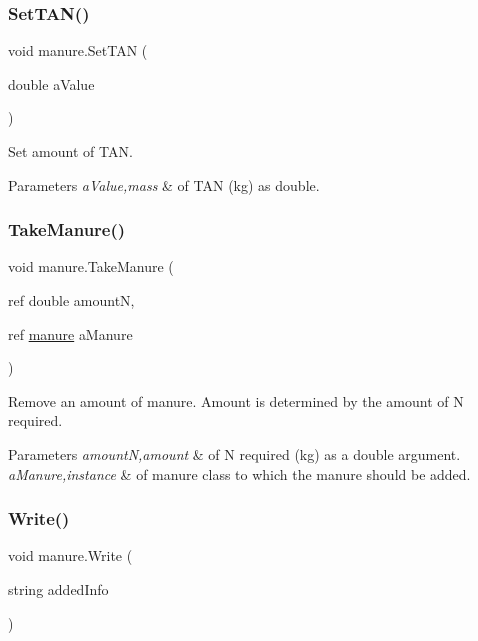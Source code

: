 \subsubsection{\texorpdfstring{SetTAN()}{SetTAN()}}
{\footnotesize\ttfamily void manure.\+Set\+T\+AN (\begin{DoxyParamCaption}\item[{double}]{a\+Value }\end{DoxyParamCaption})\hspace{0.3cm}{\ttfamily [inline]}}



Set amount of T\+AN. 


\begin{DoxyParams}{Parameters}
{\em a\+Value,mass} & of T\+AN (kg) as double. \\
\hline
\end{DoxyParams}
\mbox{\label{classmanure_a0343f18d1a91ea0e5ba040a3c8d98e15}} 
\subsubsection{\texorpdfstring{TakeManure()}{TakeManure()}}
{\footnotesize\ttfamily void manure.\+Take\+Manure (\begin{DoxyParamCaption}\item[{ref double}]{amountN,  }\item[{ref \mbox{\hyperlink{classmanure}{manure}}}]{a\+Manure }\end{DoxyParamCaption})\hspace{0.3cm}{\ttfamily [inline]}}



Remove an amount of manure. Amount is determined by the amount of N required. 


\begin{DoxyParams}{Parameters}
{\em amountN,amount} & of N required (kg) as a double argument. \\
\hline
{\em a\+Manure,instance} & of manure class to which the manure should be added. \\
\hline
\end{DoxyParams}
\mbox{\label{classmanure_a4410908e8e38c56c60ecffd7ee3eeb9a}} 
\subsubsection{\texorpdfstring{Write()}{Write()}}
{\footnotesize\ttfamily void manure.\+Write (\begin{DoxyParamCaption}\item[{string}]{added\+Info }\end{DoxyParamCaption})\hspace{0.3cm}{\ttfamily [inline]}}



